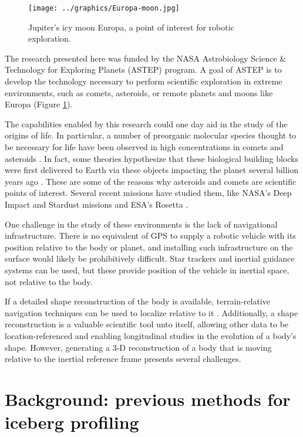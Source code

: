 \begin{figure}[htb]
   \centering
   \texttt{[image: ../graphics/Europa-moon.jpg]} %
   \caption{Jupiter's icy moon Europa, a point of interest for robotic exploration.}
   \label{fig:Europa}
\end{figure}

The research presented here was funded by the NASA Astrobiology Science \& Technology for Exploring Planets (ASTEP) program. A goal of ASTEP is to develop the technology necessary to perform scientific  exploration in extreme environments, such as comets, asteroids, or remote planets and moons like Europa (Figure \ref{fig:Europa}).

The capabilities enabled by this research could one day aid in the study of the origins of life. In particular, a number of preorganic molecular species thought to be necessary for life have been observed in high concentrations in comets and asteroids \cite{Fomenkova1999}. In fact, some theories hypothesize that these biological building blocks were first delivered to Earth via these objects impacting the planet several billion years ago \cite{Chyba1992}. These are some of the reasons why asteroids and comets are scientific points of interest. Several recent missions have studied them, like NASA's Deep Impact and Stardust missions\cite{Ahearn2005,Willcockson1999} and ESA's Rosetta \cite{Bibring2007}.

One challenge in the study of these environments is the lack of navigational infrastructure. There is no equivalent of GPS to supply a robotic vehicle with its position relative to the body or planet, and installing such infrastructure on the surface would likely be prohibitively difficult. Star trackers and inertial guidance systems can be used, but these provide position of the vehicle in inertial space, not relative to the body.

If a detailed shape reconstruction of the body is available, terrain-relative navigation techniques can be used to localize relative to it \cite{Anonsen2006,Anonsen2007}. Additionally, a shape reconstruction is a valuable scientific tool unto itself, allowing other data to be location-referenced and enabling longitudinal studies in the evolution of a body's shape. However, generating a 3-D reconstruction of a body that is moving relative to the inertial reference frame presents several challenges.

\section{Background: previous methods for iceberg profiling}

